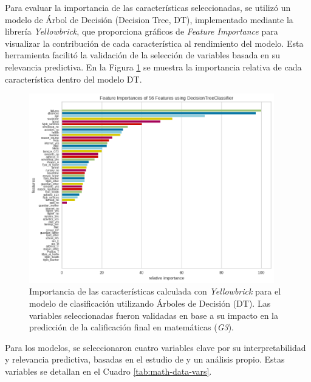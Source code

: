 Para evaluar la importancia de las características seleccionadas, se utilizó un modelo de Árbol de Decisión (Decision Tree, DT), implementado mediante la librería \textit{Yellowbrick}, que proporciona gráficos de \textit{Feature Importance} para visualizar la contribución de cada característica al rendimiento del modelo. Esta herramienta facilitó la validación de la selección de variables basada en su relevancia predictiva. En la Figura \ref{fig:feature-importance} se muestra la importancia relativa de cada característica dentro del modelo DT.

\begin{figure}[H]
    \centering
    \includegraphics[width=0.95\textwidth]{include/importance_features.png}
    \caption{Importancia de las características calculada con \textit{Yellowbrick} para el modelo de clasificación utilizando Árboles de Decisión (DT). Las variables seleccionadas fueron validadas en base a su impacto en la predicción de la calificación final en matemáticas (\textit{G3}).}
    \label{fig:feature-importance}
\end{figure}

Para los modelos, se seleccionaron cuatro variables clave por su interpretabilidad y relevancia predictiva, basadas en el estudio de \cite{cortez-2014} y un análisis propio. Estas variables se detallan en el Cuadro \ref{tab:math-data-vars}.

